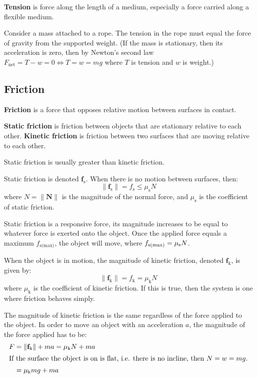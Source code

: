 \documentclass{article}
\newcommand{\definition}[1]{\begin{tcolorbox}[colback=red!5!white,colframe=red!75!black,parbox=false] #1 \end{tcolorbox}}
\begin{document}
\definition{\textbf{Tension} is force along the length of a medium, especially a force carried along a flexible medium.}

Consider a mass attached to a rope. The tension in the rope must equal the force of gravity from the supported weight. (If the mass is stationary, then its acceleration is zero, then by Newton's second law $F_{\text{net}}=T-w=0\iff T=w=mg$ where $T$ is tension and $w$ is weight.)

\subsection{Friction}

\definition{\textbf{Friction} is a force that opposes relative motion between surfaces in contact.}

\definition{\textbf{Static friction} is friction between objects that are stationary relative to each other. \textbf{Kinetic friction} is friction between two surfaces that are moving relative to each other.}

Static friction is usually greater than kinetic friction.

Static friction is denoted $\mathbf{f}_{\text{s}}$. When there is no motion between surfaces, then:
\begin{equation*}
	\lVert \mathbf{f}_{\text{s}}\rVert =f_{\text{s}}\leq \mu_{\text{s}} N
\end{equation*}
where $N=\lVert \mathbf N \rVert $ is the magnitude of the normal force, and $\mu_{\text{s}}$ is the coefficient of static friction.

Static friction is a responsive force, its magnitude increases to be equal to whatever force is exerted onto the object. Once the applied force equals a maximum $f_{\text{s(max)}}$, the object will move, where $f_{\text{s(max)}}=\mu_{\text s}N$.

When the object is in motion, the magnitude of kinetic friction, denoted $\mathbf{f}_{\text{k}}$, is given by:
\begin{equation*}
	\lVert \mathbf{f}_{\text{k}}\rVert =f_{\text{k}}=\mu_{\text{k}} N
\end{equation*}
where $\mu_{\text{k}}$ is the coefficient of kinetic friction. If this is true, then the system is one where friction behaves simply.

The magnitude of kinetic friction is the same regardless of the force applied to the object. In order to move an object with an acceleration $a$, the magnitude of the force applied has to be:
\begin{align*}
	F
	&=\lVert \mathbf{f}_{\text{k}} \rVert +ma
	=\mu_{\text{k}}N+ma \\
	\intertext{If the surface the object is on is flat, i.e. there is no incline, then $N=w=mg$.}
	&=\mu_{\text{k}}mg+ma
\end{align*}
\end{document}
